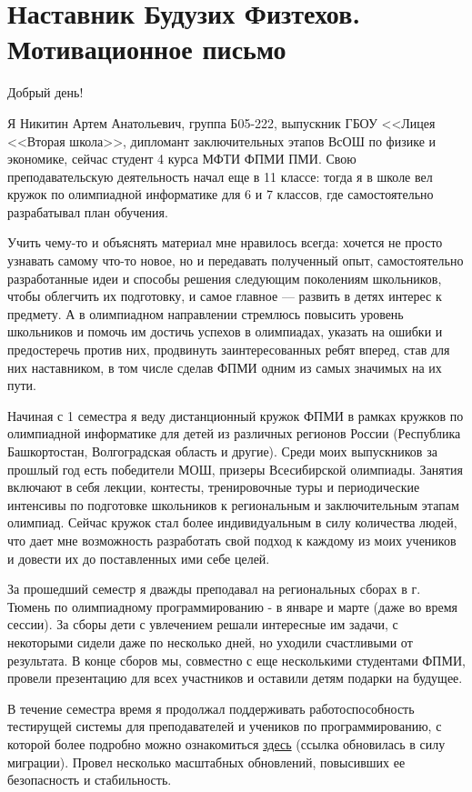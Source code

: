 \section{\textbf{Наставник Будузих Физтехов. Мотивационное письмо}}
\smallskip

\quad Добрый день!
\smallskip

\quad Я Никитин Артем Анатольевич, группа Б05-222, выпускник ГБОУ <<Лицея <<Вторая школа>>, дипломант
заключительных этапов ВсОШ по физике и экономике, сейчас студент 4 курса МФТИ ФПМИ ПМИ. Свою преподавательскую деятельность начал еще в
11 классе: тогда я в школе вел кружок по олимпиадной информатике для 6 и 7 классов, где самостоятельно разрабатывал план обучения.

\quad Учить чему-то и объяснять материал мне нравилось всегда: хочется не просто узнавать самому что-то новое, но и передавать полученный
опыт, самостоятельно разработанные идеи и способы решения следующим поколениям школьников, чтобы облегчить их подготовку, и самое главное –--
развить в детях интерес к предмету. А в олимпиадном направлении стремлюсь повысить уровень школьников и помочь им достичь успехов в олимпиадах,
указать на ошибки и предостеречь против них, продвинуть заинтересованных ребят вперед, став для них наставником, в том числе сделав ФПМИ одним
из самых значимых на их пути.

\quad Начиная с 1 семестра я веду дистанционный кружок ФПМИ в рамках кружков по олимпиадной информатике для детей из различных регионов России
(Республика Башкортостан, Волгоградская область и другие). Среди моих выпускников за прошлый год есть победители МОШ,
призеры Всесибирской олимпиады. Занятия включают в себя лекции, контесты, тренировочные туры и периодические интенсивы по подготовке школьников
к региональным и заключительным этапам олимпиад. Сейчас кружок стал более индивидуальным в силу количества людей, что дает мне возможность
разработать свой подход к каждому из моих учеников и довести их до поставленных ими себе целей.

\quad За прошедший семестр я дважды преподавал на региональных сборах в г. Тюмень по олимпиадному программированию - в январе и марте (даже во
время сессии). За сборы дети с увлечением решали интересные им задачи, с некоторыми сидели даже по несколько дней, но уходили
счастливыми от результата. В конце сборов мы, совместно с еще несколькими студентами ФПМИ, провели презентацию для всех участников и оставили
детям подарки на будущее.

\quad В течение семестра время я продолжал поддерживать работоспособность тестирущей системы для преподавателей и учеников
по программированию, с которой более подробно можно ознакомиться \href{https://algocode.madprogrammer.net/main/1/}{здесь}
(ссылка обновилась в силу миграции). Провел несколько масштабных обновлений, повысивших ее безопасность и стабильность.

